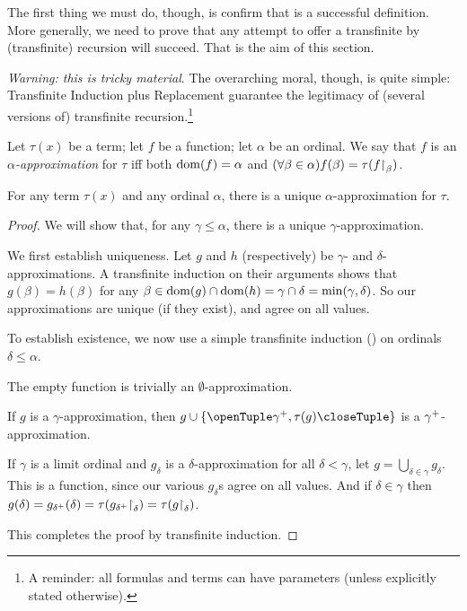 \documentclass[../../../include/open-logic-section]{subfiles}
\begin{document}

The first thing we must do, though, is confirm that
 is a successful definition. More generally,
we need to prove that any attempt to offer a transfinite by
(transfinite) recursion will succeed. That is the aim of this section.

\emph{Warning: this is tricky material}. The overarching moral,
though, is quite simple: Transfinite Induction plus Replacement
guarantee the legitimacy of (several versions of) transfinite
recursion.\footnote{A reminder: all formulas and terms can have parameters (unless explicitly stated otherwise).}

\begin{defn}
	Let $\tau(x)$ be a term; let $f$ be a function; let $\alpha$ be an ordinal. We say that $f$ is an \emph{$\alpha$-approximation} for $\tau$ iff both $\mathrm{dom}(f) = \alpha$ and $(\forall \beta \in \alpha)f(\beta) = \tau(f\mathord{\restriction}_{\beta})$.
\end{defn}

\begin{lem}
For any term $\tau(x)$ and any ordinal $\alpha$, there is a unique $\alpha$-approximation for $\tau$.
\end{lem}
\begin{proof}
We will show that, for any $\gamma \leq \alpha$, there is a unique
$\gamma$-approximation. 

We first establish uniqueness. Let $g$ and $h$ (respectively) be $\gamma$- and $\delta$-approximations. A transfinite induction on their arguments shows that
$g(\beta) = h(\beta)$ for any $\beta \in \mathrm{dom}(g) \cap \mathrm{dom}(h) =
\gamma \cap \delta = \min(\gamma, \delta)$. So our approximations are unique (if they exist), and agree on all values.

To establish existence, we now use a simple transfinite induction
() on ordinals
$\delta \leq \alpha$. 

The empty function is trivially an $\emptyset$-approximation. 

If $g$ is a $\gamma$-approximation, then $g \cup
\{\tuple{\ordsucc{\gamma}, \tau(g)}\}$ is a $\gamma^{+}$-approximation.

If $\gamma$ is a limit ordinal and $g_\delta$ is a $\delta$-approximation for all $\delta < \gamma$, let $g = \bigcup_{\delta \in \gamma} g_\delta$. This
is a function, since our various $g_\delta$s agree on all values. And
if $\delta \in \gamma$ then $g(\delta) = g_{\delta^{+}}(\delta) =
\tau(g_{\delta^{+}}\mathord{\restriction}_{\delta}) =
\tau(g\mathord{\restriction}_{\delta})$.

This completes the proof by transfinite induction.
\end{proof}
\end{document}

